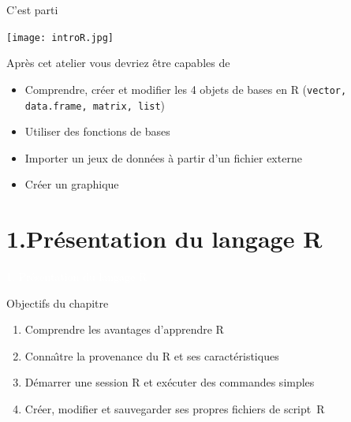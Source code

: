\documentclass[11pt]{beamer}\usepackage[]{graphicx}\usepackage[]{color}
\newcommand{\code}[1]{\texttt{#1}}
\begin{document}
\begin{frame}[plain]{C'est parti}
\hspace*{-1.5cm}\parbox[t]{\textwidth}{
\begin{center}
\texttt{[image: introR.jpg]}
\end{center}
}
\end{frame}


\begin{frame}[plain]
\hspace*{-1.0cm}\parbox[t]{\textwidth}{
\begin{block}{Après cet atelier vous devriez \^{e}tre capables de}
\begin{itemize}
\item Comprendre, créer et modifier les 4 objets de bases en R (\code{vector, data.frame, matrix, list}) 
\item Utiliser des fonctions de bases
\item Importer un jeux de données à partir d'un fichier externe
\item Créer un graphique 
\end{itemize}
\end{block}
}
\end{frame}


\section{1.Pr\'{e}sentation du langage R}

\begin{frame}[plain]
\hspace*{-1.0cm}\parbox[t]{\textwidth}{
 \begin{center}
  \Huge{\textcolor{white}{1. Pr\'{e}sentation du langage R}}
 \end{center}
 }
\end{frame}


\begin{frame}[plain]
\hspace*{-1.0cm}\parbox[t]{\textwidth}{
\begin{block}{Objectifs du chapitre}
\begin{enumerate}
\item Comprendre les avantages d'apprendre R
\item Conna\^{\i}tre la provenance du R et ses caract\'{e}ristiques
\item D\'{e}marrer une session R et ex\'{e}cuter des commandes simples
\item Cr\'{e}er, modifier et sauvegarder ses propres fichiers de \mbox{script R}
\end{enumerate}
\end{block}
}
\end{frame}
\end{document}
